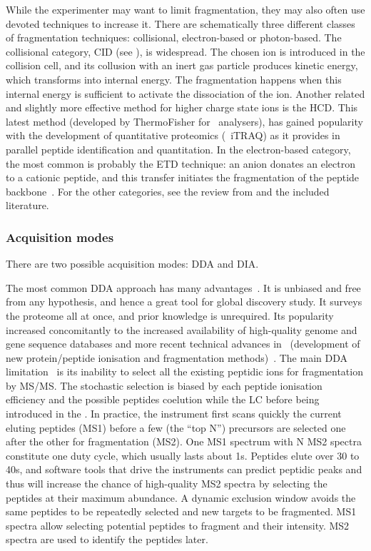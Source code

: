 While the experimenter may want to limit fragmentation,
they may also often use devoted techniques to increase it.
There are schematically three different classes of fragmentation techniques:
collisional, electron-based or photon-based.
The collisional category, \gls{CID} (see ),
is widespread.
The chosen ion is introduced in the collision cell,
and its collusion with an inert gas particle produces kinetic energy,
which transforms into internal energy.
The fragmentation happens when this internal energy is sufficient to activate
the dissociation of the ion.
Another related and slightly more effective method
for higher charge state ions is the \acrfull{HCD}.
This latest method (developed by ThermoFisher for \orbi\ analysers),
has gained popularity with the development of quantitative proteomics
(\eg\ \gls{iTRAQ})
as it provides in parallel peptide identification and quantitation.
In the electron-based category,
the most common is probably the \acrfull{ETD} technique:
an anion donates an electron to a cationic peptide,
and this transfer initiates
the fragmentation of the peptide backbone~.
For the other categories,
see the review from \citet{Zhang2014} and the included literature.

\subsubsection{Acquisition modes}
There are two possible acquisition modes: \gls{DDA} and \gls{DIA}.

The most common \gls{DDA} approach has many advantages~.
It is unbiased and free from any hypothesis,
and hence a great tool for global discovery study.
It surveys the proteome all at once,
and prior knowledge is unrequired.
Its popularity increased concomitantly to the increased availability of
high-quality genome and gene sequence databases
and more recent technical advances in \ms\
(development of new protein/peptide ionisation
and fragmentation methods)~.
The main \gls{DDA} limitation~\mycite{Guillaumot2017-ba} is its inability
to select all the existing peptidic ions for fragmentation by \gls{MS/MS}.
The stochastic selection is biased by
each peptide ionisation efficiency
and the possible peptides coelution
while the \gls{LC} before being introduced in the \ms.
In practice, the instrument first scans quickly the current eluting peptides (MS1)
before a few (the ``top N'') precursors are selected
one after the other for fragmentation (MS2).
One MS1 spectrum with N MS2 spectra constitute one duty cycle,
which usually lasts about 1s.
Peptides elute over 30 to 40s,
and software tools that drive the instruments can predict peptidic peaks
and thus will increase the chance of high-quality MS2 spectra
by selecting the peptides at their maximum abundance.
A dynamic exclusion window avoids the same peptides to be repeatedly selected and
new targets to be fragmented.
MS1 spectra allow selecting potential peptides to fragment and their intensity.
MS2 spectra are used to identify the peptides later.

